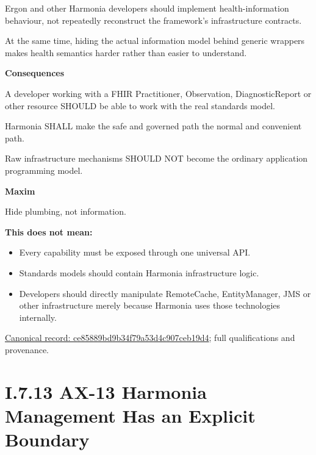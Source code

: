 Ergon and other Harmonia developers should
implement health-information behaviour, not repeatedly reconstruct the
framework's infrastructure contracts.



At the same time, hiding the actual information model behind generic
wrappers makes health semantics harder rather than easier to understand.



\par\medskip\textbf{Consequences}\par


A developer working with a FHIR Practitioner, Observation,
DiagnosticReport or other resource SHOULD be able to work with the real
standards model.



Harmonia SHALL make the safe and governed path the normal and convenient
path.



Raw infrastructure mechanisms SHOULD NOT become the ordinary application
programming model.



\par\medskip\textbf{Maxim}\par


Hide plumbing, not information.



\textbf{This does not mean:}



\begin{itemize}


\item Every capability must be exposed through one universal API.

\item Standards models should contain Harmonia infrastructure logic.

\item Developers should directly manipulate RemoteCache, EntityManager, JMS or other infrastructure merely because Harmonia uses those technologies internally.

\end{itemize}

{\footnotesize \href{../../../../../../../continuum/motivation/principle/ce85889bd9b34f79a53d4c907ceb19d4.md}{Canonical record: ce85889bd9b34f79a53d4c907ceb19d4}; full qualifications and provenance.}\par
\section*{I.7.13 AX-13 Harmonia Management Has an Explicit Boundary}
\label{navigation:I.7.13}

